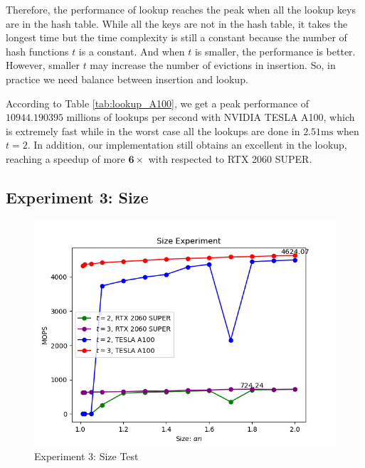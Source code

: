 \documentclass[10pt,twocolumn,letterpaper]{article}
\begin{document}
Therefore, the performance of lookup reaches the peak when all the lookup keys are in the hash table. While all the keys are not in the hash table, it takes the longest time but the time complexity is still a constant because the number of hash functions $t$ is a constant. And when $t$ is smaller, the performance is better. However, smaller $t$ may increase the number of evictions in insertion. So, in practice we need balance between insertion and lookup.

According to Table \ref{tab:lookup_A100}, we get a peak performance of $\mathbf{10944.190395}$ millions of lookups per second with NVIDIA TESLA A100, which is extremely fast while in the worst case all the lookups are done in $2.51\text{ms}$ when $t = 2$. In addition, our implementation still obtains an excellent in the lookup, reaching a speedup of more $\mathbf{6 \times}$ with respected to RTX 2060 SUPER.

\subsection{Experiment 3: Size}

\begin{figure}[!h]
    \centering
    \includegraphics[scale=0.5]{figures/3.png}
    \caption{Experiment 3: Size Test}
    \label{fig:experiment3}
\end{figure}
\end{document}
